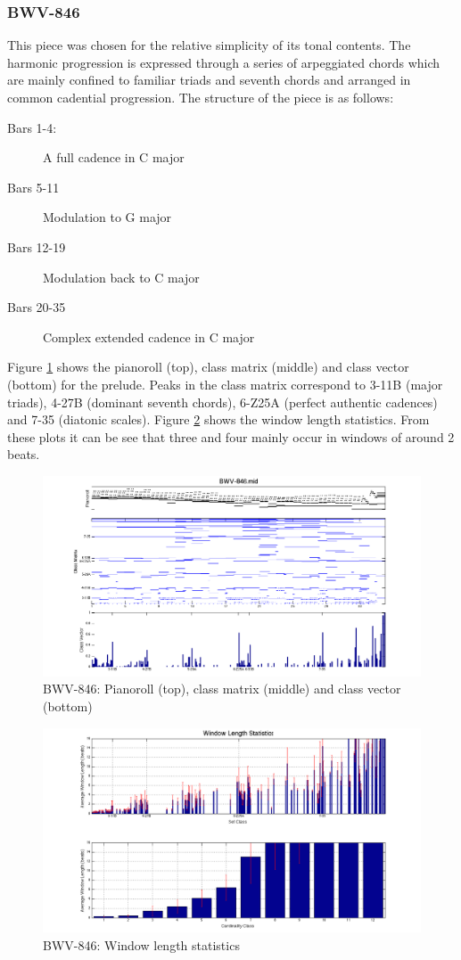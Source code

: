 \documentclass{article}
\begin{document}
\subsubsection{BWV-846}
\label{sec-8-1-1}

This piece was chosen for the relative simplicity of its tonal
contents. The harmonic progression is expressed through a series of
arpeggiated chords which are mainly confined to familiar triads and
seventh chords and arranged in common cadential progression. The
structure of the piece is as follows:
\begin{description}
\item[Bars 1-4:] A full cadence in C major
\item[Bars 5-11] Modulation to G major
\item[Bars 12-19] Modulation back to C major
\item[Bars 20-35] Complex extended cadence in C major
\end{description} 
Figure \ref{fig:bach} shows the pianoroll (top), class matrix
(middle) and class vector (bottom) for the prelude. Peaks in the class
matrix correspond to 3-11B (major triads), 4-27B (dominant seventh
chords), 6-Z25A (perfect authentic cadences) and 7-35 (diatonic
scales).  Figure \ref{fig:bachseg} shows the window length
statistics. From these plots it can be see that three and four mainly
occur in windows of around 2 beats.
\begin{figure}[htb]
 \centering
 \includegraphics[width=.8\linewidth]{./plots/bach.png}
 \caption{\label{fig:bach}BWV-846: Pianoroll (top), class matrix (middle) and class vector (bottom)}
 \end{figure} 

\begin{figure}[htb]
\centering
\includegraphics[width=.8\linewidth]{./plots/bachseg.png}
\caption{\label{fig:bachseg}BWV-846: Window length statistics}
\end{figure}
\end{document}
